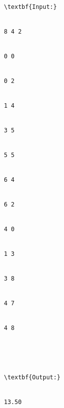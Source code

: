 \begin{verbatim}
\textbf{Input:}


8 4 2


0 0


0 2


1 4


3 5


5 5


6 4


6 2


4 0


1 3


3 8


4 7


4 8





\textbf{Output:}


13.50


\end{verbatim}